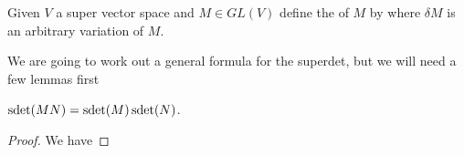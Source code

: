 \documentclass{article}
\begin{document}
\begin{definition}
	Given $V$ a super vector space and $M \in GL(V)$ define the  of $M$ by 
where $\delta M$ is an arbitrary variation of $M$. 
\end{definition}
We are going to work out a general formula for the superdet, but we will need a few lemmas first
\begin{lemma}
	$\operatorname{sdet}(MN) = \operatorname{sdet}(M) \operatorname{sdet}(N)$.
\end{lemma}
\begin{proof}
	We have 
\end{proof}
\end{document}
